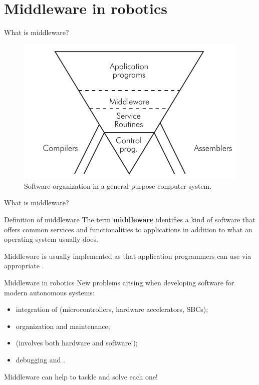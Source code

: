
\section{Middleware in robotics}
\graphicspath{{figs/section2/}}

\begin{frame}{What is middleware?}
	\begin{figure}
		\centering
		\includegraphics[width=.64\textwidth]{softwarePyramid.png}
		\caption{Software organization in a general-purpose computer system.}
		\label{fig:swpyramid}
	\end{figure}
\end{frame}
\begin{frame}{What is middleware?}
	\begin{block}{Definition of middleware}
		\justifying
		The term \textbf{middleware} identifies a kind of software that offers common services and functionalities to applications in addition to what an operating system usually does.
	\end{block}
	\justifying
	Middleware is usually implemented as  that application programmers can use via appropriate .
\end{frame}

\begin{frame}{Middleware in robotics}
	\justifying
	New problems arising when developing software for modern autonomous systems:
	\begin{itemize}
		\item integration of  (microcontrollers, hardware accelerators, SBCs);
		\item {} organization and maintenance;
		\item {} (involves both hardware and software!);
		\item debugging and .
	\end{itemize}
	\begin{block}{}
		\centering
		Middleware can help to tackle and solve each one!
	\end{block}
\end{frame}

